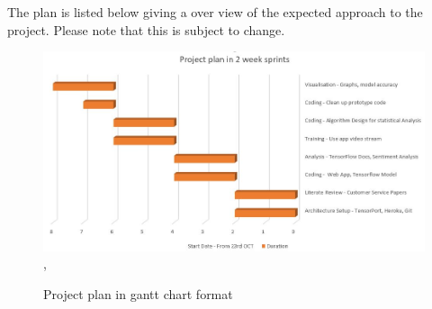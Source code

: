 The plan is listed below giving a over view of the expected approach to the project. Please note that this is subject to change.

\begin{figure}[ht]
	\begin{center}
		\advance\leftskip-3cm
		\advance\rightskip-3cm
		\includegraphics[keepaspectratio=true,scale=0.99]{resources/plan.jpg}
		\label{fig: plan},
		\caption{Project plan in gantt chart format}
		\label{pop}
	\end{center}
\end{figure}

